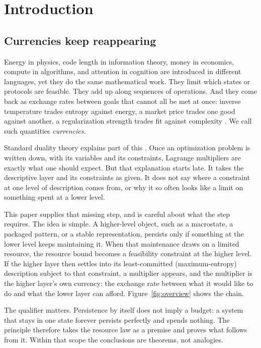 \section{Introduction}\label{sec:intro}

\subsection{Currencies keep reappearing}

Energy in physics, code length in information theory, money in economics, compute in algorithms, and attention in cognition are introduced in different languages, yet they do the same mathematical work. They limit which states or protocols are feasible. They add up along sequences of operations. And they come back as exchange rates between goals that cannot all be met at once: inverse temperature trades entropy against energy, a market price trades one good against another, a regularization strength trades fit against complexity \cite{jaynes1957information,shannon1948mathematical,arrowdebreu1954,sims2003rationalinattention}. We call such quantities \emph{currencies}.

Standard duality theory explains part of this \cite{boyd2004convex}. Once an optimization problem is written down, with its variables and its constraints, Lagrange multipliers are exactly what one should expect. But that explanation starts late. It takes the descriptive layer and its constraints as given. It does not say where a constraint at one level of description comes from, or why it so often looks like a limit on something spent at a lower level.

This paper supplies that missing step, and is careful about what the step requires. The idea is simple. A higher-level object, such as a macrostate, a packaged pattern, or a stable representation, persists only if something at the lower level keeps maintaining it. When that maintenance draws on a limited resource, the resource bound becomes a feasibility constraint at the higher level. If the higher layer then settles into its least-committed (maximum-entropy) description subject to that constraint, a multiplier appears, and the multiplier is the higher layer's own currency: the exchange rate between what it would like to do and what the lower layer can afford. Figure~\ref{fig:overview} shows the chain.

The qualifier matters. Persistence by itself does not imply a budget: a system that stays in one state forever persists perfectly and spends nothing. The principle therefore takes the resource law as a premise and proves what follows from it. Within that scope the conclusions are theorems, not analogies.

